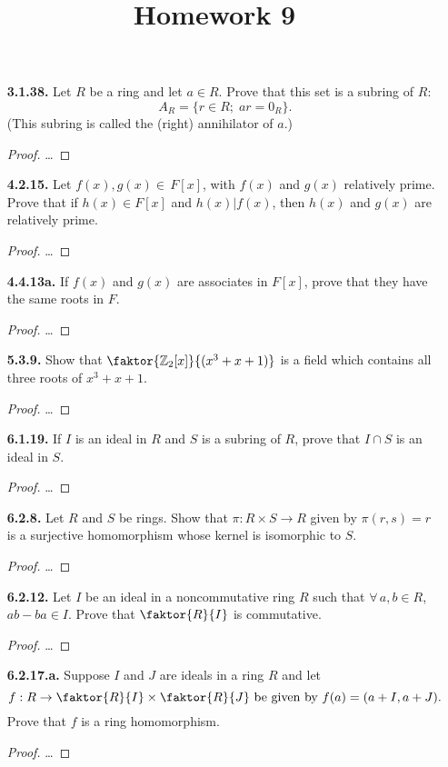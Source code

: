 \documentclass[12pt]{article}
\title{Homework 9}
\newcommand{\zee}{\mathbb{Z}}
\begin{document}
	\begin{itemize}
		\item[\textbf{ 3.1.38.}] Let $R$ be a ring and let $a\in R$. Prove that this set is a subring of $R$: \[A_R=\{r\in R;\; ar=0_R\}.\]  (This subring is called the (right) annihilator of $a$.)
		\begin{proof}
			\dots
		\end{proof}

		\item[\textbf{ 4.2.15.}] Let $f(x),g(x)\in\,F[x]$, with $f(x)$ and $g(x)$ relatively prime. Prove that if $h(x)\in F[x]$ and $h(x) | f(x)$, then $h(x)$ and $g(x)$ are relatively prime.
		\begin{proof}
			\dots
		\end{proof}

		\item[\textbf{ 4.4.13a.}] If $f(x)$ and $g(x)$ are associates in $F[x]$, prove that they have the same roots in $F$.
		\begin{proof}
			\dots
		\end{proof}

		\item[\textbf{ 5.3.9.}] Show that $\faktor{\zee_2[x]}{(x^3+x+1)}$ is a field which contains all three roots of $x^3+x+1$.
		\begin{proof}
			\dots
		\end{proof}

		\item[\textbf{ 6.1.19.}] If $I$ is an ideal in $R$ and $S$ is a subring of $R$, prove that $I\cap S$ is an ideal in $S$.
		\begin{proof}
			\dots
		\end{proof}

		\item[\textbf{ 6.2.8.}] Let $R$ and $S$ be rings. Show that $\pi: R\times S\to R$ given by $\pi(r,s)=r$ is a surjective homomorphism whose kernel is isomorphic to $S$.
		\begin{proof}
			\dots
		\end{proof}

		\item[\textbf{ 6.2.12.}] Let $I$ be an ideal in a noncommutative ring $R$ such that $\forall\,a,b\in R$, $ab-ba\in I$. Prove that $\faktor{R}{I}$ is commutative.
		\begin{proof}
			\dots
		\end{proof}

		\item[\textbf{ 6.2.17.a.}] Suppose $I$ and $J$ are ideals in a ring $R$ and let \[f: R\to \faktor{R}{I}\times \faktor{R}{J}\text{ be given by } f(a)=(a+I, a+J).\] Prove that $f$ is a ring homomorphism.
		\begin{proof}
			\dots
		\end{proof}


\end{itemize}
\end{document}
